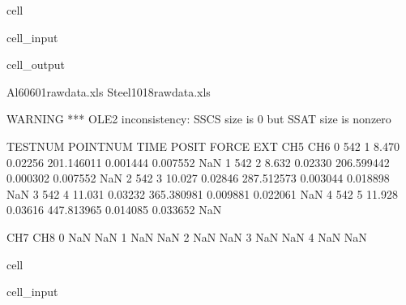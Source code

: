 \documentclass[letterpaper,10pt,english]{jupyterBook}
\begin{document}
{{\begin{sphinxuseclass}{cell}
\begin{sphinxVerbatimInput}
\begin{sphinxuseclass}{cell_input}
\end{sphinxuseclass}\end{sphinxVerbatimInput}
\begin{sphinxVerbatimOutput}

\begin{sphinxuseclass}{cell_output}
\begin{sphinxVerbatim}[commandchars=\\\{\}]
Al60601\PYGZus{}raw\PYGZus{}data.xls  Steel1018\PYGZus{}raw\PYGZus{}data.xls
\end{sphinxVerbatim}

\begin{sphinxVerbatim}[commandchars=\\\{\}]
WARNING *** OLE2 inconsistency: SSCS size is 0 but SSAT size is non\PYGZhy{}zero
\end{sphinxVerbatim}

\begin{sphinxVerbatim}[commandchars=\\\{\}]
   TESTNUM  POINTNUM    TIME    POSIT       FORCE       EXT       CH5  CH6  \PYGZbs{}
0      542         1   8.470  0.02256  201.146011 \PYGZhy{}0.001444  0.007552  NaN   
1      542         2   8.632  0.02330  206.599442  0.000302  0.007552  NaN   
2      542         3  10.027  0.02846  287.512573  0.003044  0.018898  NaN   
3      542         4  11.031  0.03232  365.380981  0.009881  0.022061  NaN   
4      542         5  11.928  0.03616  447.813965  0.014085  0.033652  NaN   

   CH7  CH8  
0  NaN  NaN  
1  NaN  NaN  
2  NaN  NaN  
3  NaN  NaN  
4  NaN  NaN  
\end{sphinxVerbatim}

\end{sphinxuseclass}\end{sphinxVerbatimOutput}

\end{sphinxuseclass}
\begin{sphinxuseclass}{cell}\begin{sphinxVerbatimInput}

\begin{sphinxuseclass}{cell_input}
\begin{sphinxVerbatim}[commandchars=\\\{\}]
  
\end{sphinxVerbatim}


\end{sphinxuseclass}
\end{sphinxVerbatimInput}
\end{sphinxuseclass}}}
\end{document}
